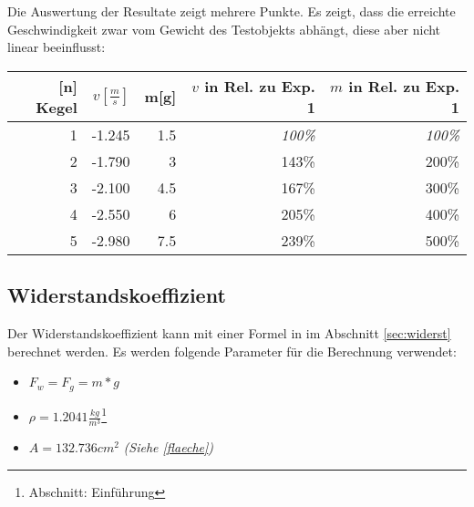 Die Auswertung der Resultate zeigt mehrere Punkte. Es zeigt, dass die erreichte Geschwindigkeit zwar vom Gewicht des Testobjekts abhängt, diese aber nicht linear beeinflusst:

\begin{tabular}{rrrrr}
	\textbf{[n] Kegel} & \(v[\frac{m}{s}]\) & m[g] & {\small \(v\) in Rel. zu Exp. 1} & {\small \(m\) in Rel. zu Exp. 1} \\ \hline
	1 & -1.245 & 1.5 & \textit{100\%} & \textit{100\%} \\
	2 & -1.790 & 3   & 143\% & 200\% \\
	3 & -2.100 & 4.5 & 167\% & 300\% \\
	4 & -2.550 & 6   & 205\% & 400\% \\
	5 & -2.980 & 7.5 & 239\% & 500\% \\
\end{tabular}

\subsection{Widerstandskoeffizient}

Der Widerstandskoeffizient kann mit einer Formel in im Abschnitt \ref{sec:widerst} berechnet werden. Es werden folgende Parameter für die Berechnung verwendet:
\begin{itemize}
	\item \(F_w = F_g = m * g\)
	\item \(\rho = 1.2041 \frac{kg}{m^3} \)\footnote{\cite{wikiluftdichte} Abschnitt: Einführung}
	\item \(A = 132.736 cm^2\) \textit{(Siehe \ref{flaeche})}
\end{itemize}

